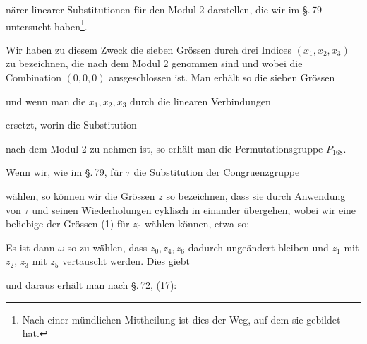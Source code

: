 närer linearer Substitutionen für den Modul 2 darstellen, die wir im \S.\,79 untersucht haben\footnote{Nach einer mündlichen Mittheilung ist dies der Weg, auf dem sie  gebildet hat.}.

Wir haben zu diesem Zweck die sieben Grössen durch drei Indices $(x_1, x_2, x_3)$ zu bezeichnen, die nach dem Modul 2 genommen sind und wobei die Combination $(0, 0, 0)$ ausgeschlossen ist. Man erhält so die sieben Grössen


und wenn man die $x_1, x_2, x_3$ durch die linearen Verbindungen


ersetzt, worin die Substitution


nach dem Modul 2 zu nehmen ist, so erhält man die Permutationsgruppe $P_{168}$.

Wenn wir, wie im \S.\,79, für $\tau$ die Substitution der Congruenzgruppe


wählen, so können wir die Grössen $z$ so bezeichnen, dass sie durch Anwendung von $\tau$ und seinen Wiederholungen cyklisch in einander übergehen, wobei wir eine beliebige der Grössen (1) für $z_0$ wählen können, etwa so:


Es ist dann $\omega$ so zu wählen, dass $z_0, z_4, z_6$ dadurch ungeändert bleiben und $z_1$ mit $z_2$, $z_3$ mit $z_5$ vertauscht werden. Dies giebt


und daraus erhält man nach \S.\,72, (17):

